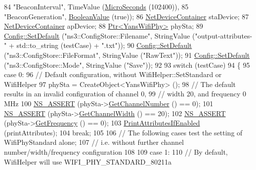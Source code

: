 \begin{DoxyCode}
84                  \textcolor{stringliteral}{"BeaconInterval"}, TimeValue (\hyperlink{group__timecivil_ga17465a639c8d1464e76538afdd78a9f0}{MicroSeconds} (102400)),
85                  \textcolor{stringliteral}{"BeaconGeneration"}, \hyperlink{classns3_1_1BooleanValue}{BooleanValue} (\textcolor{keyword}{true}));
86   \hyperlink{classns3_1_1NetDeviceContainer}{NetDeviceContainer} staDevice;
87   \hyperlink{classns3_1_1NetDeviceContainer}{NetDeviceContainer} apDevice;
88   \hyperlink{classns3_1_1Ptr}{Ptr<YansWifiPhy>} phySta;
89   \hyperlink{group__config_ga2e7882df849d8ba4aaad31c934c40c06}{Config::SetDefault} (\textcolor{stringliteral}{"ns3::ConfigStore::Filename"}, StringValue (\textcolor{stringliteral}{"output-attributes-"} + 
      std::to\_string (testCase) + \textcolor{stringliteral}{".txt"}));
90   \hyperlink{group__config_ga2e7882df849d8ba4aaad31c934c40c06}{Config::SetDefault} (\textcolor{stringliteral}{"ns3::ConfigStore::FileFormat"}, StringValue (\textcolor{stringliteral}{"RawText"}));
91   \hyperlink{group__config_ga2e7882df849d8ba4aaad31c934c40c06}{Config::SetDefault} (\textcolor{stringliteral}{"ns3::ConfigStore::Mode"}, StringValue (\textcolor{stringliteral}{"Save"}));
92 
93   \textcolor{keywordflow}{switch} (testCase)
94   \{
95     \textcolor{keywordflow}{case} 0:
96       \textcolor{comment}{// Default configuration, without WifiHelper::SetStandard or WifiHelper}
97       phySta = CreateObject<YansWifiPhy> ();
98       \textcolor{comment}{// The default results in an invalid configuration of channel 0,}
99       \textcolor{comment}{// width 20, and frequency 0 MHz}
100       \hyperlink{assert_8h_a6dccdb0de9b252f60088ce281c49d052}{NS\_ASSERT} (phySta->\hyperlink{classns3_1_1WifiPhy_a5cf0ccf06109ace61db51c83e91b7e8d}{GetChannelNumber} () == 0);
101       \hyperlink{assert_8h_a6dccdb0de9b252f60088ce281c49d052}{NS\_ASSERT} (phySta->\hyperlink{classns3_1_1WifiPhy_a4a5d5009b3b3308f2baeed42a2007189}{GetChannelWidth} () == 20);
102       \hyperlink{assert_8h_a6dccdb0de9b252f60088ce281c49d052}{NS\_ASSERT} (phySta->\hyperlink{classns3_1_1WifiPhy_ad2508d94faf22d690d6b8b4367934fd1}{GetFrequency} () == 0);
103       \hyperlink{wifi-phy-configuration_8cc_a73f0822e1f64b23097cbff2fc565842f}{PrintAttributesIfEnabled} (printAttributes);
104       \textcolor{keywordflow}{break};
105 
106     \textcolor{comment}{// The following cases test the setting of WifiPhyStandard alone;}
107     \textcolor{comment}{// i.e. without further channel number/width/frequency configuration}
108 
109     \textcolor{keywordflow}{case} 1:
110       \textcolor{comment}{// By default, WifiHelper will use WIFI\_PHY\_STANDARD\_80211a}

\end{DoxyCode}
